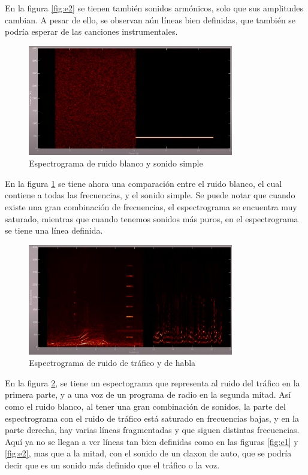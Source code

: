 \documentclass[12pt, letterpaper]{article}
\begin{document}
\noindent En la figura \ref{fig:e2} se tienen también sonidos armónicos,
solo que sus amplitudes cambian. A pesar de ello, se observan aún líneas
bien definidas, que también se podría esperar de las canciones instrumentales.

\begin{figure}[H]
  \centering
  \includegraphics[width=0.8\textwidth]{espectrogramas_04.png}
  \caption{Espectrograma de ruido blanco y sonido simple \cite{Colomer-04}}
  \label{fig:e4}
\end{figure}

\noindent En la figura \ref{fig:e4} se tiene ahora una comparación entre
el ruido blanco, el cual contiene a todas las frecuencias, y el sonido simple.
Se puede notar que cuando existe una gran combinación de frecuencias, el espectrograma
se encuentra muy saturado, mientras que cuando tenemos sonidos más puros, en el
espectrograma se tiene una línea definida.

\begin{figure}[H]
  \centering
  \includegraphics[width=0.8\textwidth]{espectrogramas_05.png}
  \caption{Espectrograma de ruido de tráfico y de habla \cite{Colomer-05}}
  \label{fig:e5}
\end{figure}

\noindent En la figura \ref{fig:e5}, se tiene un espectograma que representa al
ruido del tráfico en la primera parte, y a una voz de un programa de radio en la segunda
mitad. Así como el ruido blanco, al tener una gran combinación de sonidos, la
parte del espectrograma con el ruido de tráfico está saturado en frecuencias bajas,
y en la parte derecha, hay varias líneas fragmentadas y que siguen distintas frecuencias.
Aquí ya no se llegan a ver líneas tan bien definidas como en las figuras
\ref{fig:e1} y \ref{fig:e2}, mas que a la mitad, con el
sonido de un claxon de auto, que se podría decir que es un sonido más definido
que el tráfico o la voz. \medskip
\end{document}
